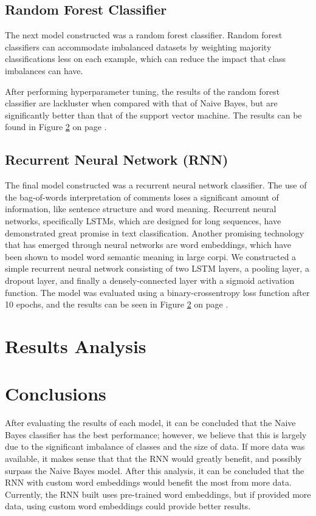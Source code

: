 \documentclass{article}
\begin{document}
{  \subsection{Random Forest Classifier}{
    The next model constructed was a random forest classifier. Random forest 
    classifiers can accommodate imbalanced datasets by weighting majority 
    classifications less on each example, which can reduce the impact that class
    imbalances can have.
    
    After performing hyperparameter tuning, the results of the random forest 
    classifier are lackluster when compared with that of Naive Bayes, but are 
    significantly better than that of the support vector machine. The results 
    can be found in Figure \ref{} on page \pageref{}.
  }

  \subsection{Recurrent Neural Network (RNN)}{
    The final model constructed was a recurrent neural network classifier. The 
    use of the bag-of-words interpretation of comments loses a significant 
    amount of information, like sentence structure and word meaning. Recurrent 
    neural networks, specifically LSTMs, which are designed for long sequences,
    have demonstrated great promise in text classification. Another promising 
    technology that has emerged through neural networks are word embeddings, 
    which have been shown to model word semantic meaning in large corpi. We 
    constructed a simple recurrent neural network consisting of two LSTM layers,
    a pooling layer, a dropout layer, and finally a densely-connected layer with
    a sigmoid activation function. The model was evaluated using a 
    binary-crossentropy loss function after 10 epochs, and the results can be 
    seen in Figure \ref{} on page \pageref{}. 
  }
 }

\section{Results Analysis}{}

\section{Conclusions}{
  After evaluating the results of each model, it can be concluded that the Naive
  Bayes classifier has the best performance; however, we believe that this is 
  largely due to the significant imbalance of classes and the size of data. If 
  more data was available, it makes sense that that the RNN would greatly 
  benefit, and possibly surpass the Naive Bayes model. After this analysis, it 
  can be concluded that the RNN with custom word embeddings would benefit the 
  most from more data. Currently, the RNN built uses pre-trained word 
  embeddings, but if provided more data, using custom word embeddings could 
  provide better results.
}



\pagebreak
{}

\end{document}
